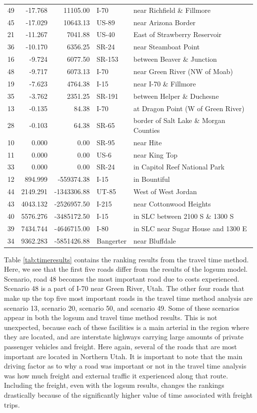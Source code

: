 \begin{table}
\begin{tabular}[t]{crrll}
49 & -17.768 & 11105.00 & I-70 & near Richfield \& Fillmore\\
45 & -17.029 & 10643.13 & US-89 & near Arizona Border\\
21 & -11.267 & 7041.88 & US-40 & East of Strawberry Reservoir\\
36 & -10.170 & 6356.25 & SR-24 & near Steamboat Point\\
16 & -9.724 & 6077.50 & SR-153 & between Beaver \& Junction\\
48 & -9.717 & 6073.13 & I-70 & near Green River (NW of Moab)\\
19 & -7.623 & 4764.38 & I-15 & near I-70 \& Fillmore\\
35 & -3.762 & 2351.25 & SR-191 & between Helper \& Duchesne\\
13 & -0.135 & 84.38 & I-70 & at Dragon Point (W of Green River)\\
28 & -0.103 & 64.38 & SR-65 & border of Salt Lake \& Morgan Counties\\
10 & 0.000 & 0.00 & SR-95 & near Hite\\
11 & 0.000 & 0.00 & US-6 & near King Top\\
33 & 0.000 & 0.00 & SR-24 & in Capitol Reef National Park\\
12 & 894.999 & -559374.38 & I-15 & in Bountiful\\
44 & 2149.291 & -1343306.88 & UT-85 & West of West Jordan\\
43 & 4043.132 & -2526957.50 & I-215 & near Cottonwood Heights\\
40 & 5576.276 & -3485172.50 & I-15 & in SLC between 2100 S \& 1300 S\\
39 & 7434.744 & -4646715.00 & I-80 & in SLC near Sugar House and 1300 E\\
34 & 9362.283 & -5851426.88 & Bangerter & near Bluffdale\\
\bottomrule
\end{tabular}
\end{table}

Table \ref{tab:timeresults} contains the ranking results from the travel
time method. Here, we see that the first five roads differ from the
results of the logsum model. Scenario, road 48 becomes the most important
road due to costs experienced. Scenario 48 is a part of I-70 near Green River,
Utah. The other four roads that make up the top five most important roads
in the travel time method analysis are scenario 13, scenario 20, scenario 50, and scenario
49. Some of these scenarios appear in both the logsum and travel time method
results. This is not unexpected, because each of these facilities is a main
arterial in the region where they are located, and are interstate highways
carrying large amounts of private passenger vehicles and freight.
Here again, several of the roads that are most important are located in
Northern Utah. It is important to note that the main driving factor as to
why a road was important or not in the travel time analysis was how much
freight and external traffic it experienced along that route. Including
the freight, even with the logsum results, changes the rankings
drastically because of the significantly higher value of time associated
with freight trips.

